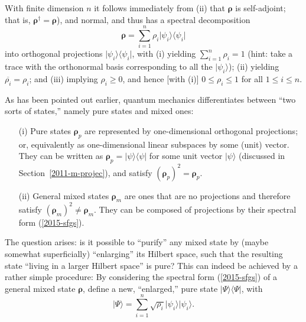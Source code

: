 With finite dimension $n$ it follows immediately from (ii)
that $\boldsymbol{\rho}$ is self-adjoint; that is,
${\boldsymbol{\rho}}^\dagger ={\boldsymbol{\rho}}$), and normal, and thus has a spectral decomposition
\begin{equation}
\boldsymbol{\rho} =\sum_{i=1}^n \rho_i \vert \psi_i\rangle \langle \psi_i \vert
\label{2015-sfgs}
\end{equation}
into orthogonal projections $\vert \psi_i\rangle \langle \psi_i \vert$,
with
(i) yielding $\sum_{i=1}^n\rho_i =1$
(hint: take a trace with the orthonormal basis corresponding to all the $\vert \psi_i\rangle$);
(ii) yielding  $\overline{\rho_i}=\rho_i$;
and (iii) implying $\rho_i \ge 0$, and hence [with (i)] $0 \le \rho_i \le 1$
for all $1\le i \le n$.


As has been pointed out earlier, quantum mechanics differentiates between ``two sorts of states,'' namely
pure states and mixed ones:
\begin{itemize}
\item[(i)]
Pure states ${\boldsymbol{\rho}}_p$  are
represented by one-dimensional orthogonal projections; or, equivalently as one-dimensional linear subspaces by some (unit) vector.
They can be written as ${\boldsymbol{\rho}}_p =  \vert \psi \rangle \langle \psi  \vert$ for some unit vector $\vert \psi \rangle$
(discussed in Section~\ref{2011-m-projec}), and
satisfy $({\boldsymbol{\rho}}_p)^2={\boldsymbol{\rho}}_p$.
\item[(ii)]
General mixed states ${\boldsymbol{\rho}}_m$  are ones that are no projections and therefore
satisfy $({\boldsymbol{\rho}}_m)^2 \neq {\boldsymbol{\rho}}_m$.
They can be composed of projections by their spectral form (\ref{2015-sfgs}).
\end{itemize}

The question arises: is it possible to ``purify'' any mixed state by (maybe somewhat superficially) ``enlarging'' its
Hilbert space, such that the resulting state ``living in a larger Hilbert space'' is pure?
This can indeed be achieved by a rather simple procedure:
By considering the spectral form (\ref{2015-sfgs}) of a general mixed state ${\boldsymbol{\rho}}$,
define a new, ``enlarged,'' pure state  $\vert \Psi\rangle \langle \Psi \vert$, with
\begin{equation}
\vert \Psi\rangle = \sum_{i=1}^n \sqrt{\rho_i}  \vert \psi_i\rangle  \vert \psi_i\rangle
.
\label{2015-puran}
\end{equation}

